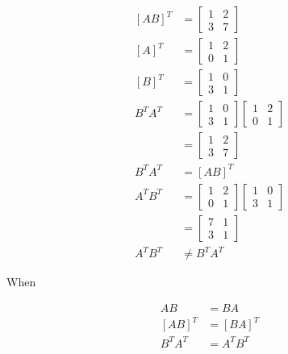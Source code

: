 \documentclass[main.tex]{subfiles}
\begin{document}
\begin{enumerate}
    $$
    \begin{aligned}
    [A B]^{T} &= \left[\begin{array}{ll}
    1 & 2 \\
    3 & 7
    \end{array}\right] \\
    [A]^{T} &= \left[\begin{array}{ll}
    1 & 2 \\
    0 & 1
    \end{array}\right] \\
    [B]^{T} &= \left[\begin{array}{ll}
    1 & 0 \\
    3 & 1
    \end{array}\right]\\
    B^{T} A^{T} &=\left[\begin{array}{ll}
    1 & 0 \\
    3 & 1
    \end{array}\right]\left[\begin{array}{ll}
    1 & 2 \\
    0 & 1
    \end{array}\right] \\
    &=\left[\begin{array}{ll}
    1 & 2 \\
    3 & 7
    \end{array}\right]\\
    B^{T} A^{T} &= [A B]^{T}\\
    A^{T} B^{T} &= \left[\begin{array}{ll}
    1 & 2 \\
    0 & 1
    \end{array}\right]\left[\begin{array}{ll}
    1 & 0 \\
    3 & 1
    \end{array}\right] \\
    &=\left[\begin{array}{ll}
    7 & 1 \\
    3 & 1
    \end{array}\right] \\
    A^{T} B^{T} & \neq B^{T} A^{T}
    \end{aligned}
    $$
    
    When
    
    $$
    \begin{aligned}
    A B &= B A\\
    [A B]^{T} & =[B A]^{T} \\
    B^{T} A^{T} &= A^{T} B^{T}
    \end{aligned}
    $$
    

\end{enumerate}
\end{document}
